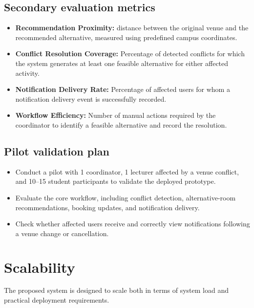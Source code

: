 \documentclass[11pt,a4paper]{article}
\begin{document}
\subsection{Secondary evaluation metrics}
\begin{itemize}[leftmargin=0.7cm]
    \item \textbf{Recommendation Proximity:} distance between the original venue and the recommended alternative, measured using predefined campus coordinates.
    \item \textbf{Conflict Resolution Coverage:} Percentage of detected conflicts for which the system generates at least one feasible alternative for either affected activity.
    \item \textbf{Notification Delivery Rate:} Percentage of affected users for whom a notification delivery event is successfully recorded.
    \item \textbf{Workflow Efficiency:} Number of manual actions required by the coordinator to identify a feasible alternative and record the resolution.
\end{itemize}

\subsection{Pilot validation plan }
\begin{itemize}[leftmargin=0.7cm]
    \item Conduct a pilot with 1 coordinator, 1 lecturer affected by a venue conflict, and 10–15 student participants to validate the deployed prototype.
    \item Evaluate the core workflow, including conflict detection, alternative-room recommendations, booking updates, and notification delivery.
    \item Check whether affected users receive and correctly view notifications following a venue change or cancellation.
\end{itemize}


\section{Scalability}
The proposed system is designed to scale both in terms of system load and practical deployment requirements.
\end{document}
